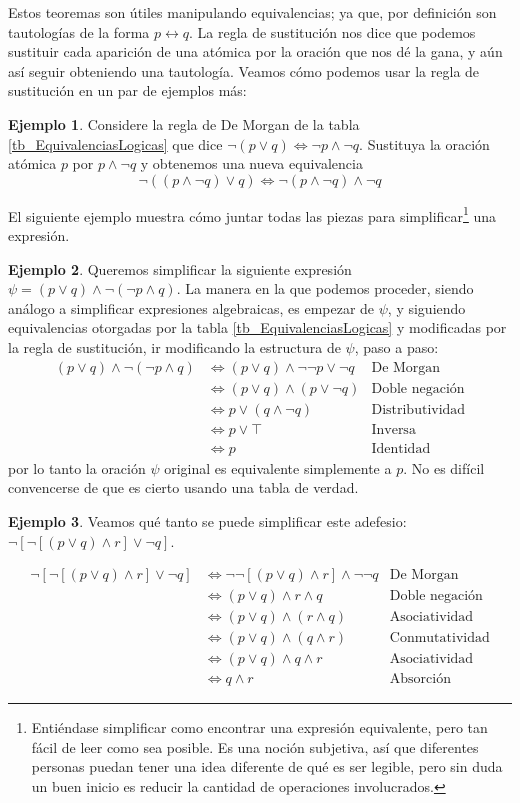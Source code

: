 \documentclass{book}
\theoremstyle{definition}
\newtheorem{ejm}{Ejemplo}[chapter]
\begin{document}
Estos teoremas son útiles manipulando equivalencias; ya que, por definición son tautologías de la forma $p\leftrightarrow q$.
La regla de sustitución nos dice que podemos sustituir cada aparición de una atómica por la oración que nos dé la gana, y aún así seguir obteniendo una tautología.
Veamos cómo podemos usar la regla de sustitución en un par de ejemplos más:
\begin{ejm}
	Considere la regla de De Morgan de la tabla \ref{tb_EquivalenciasLogicas} que dice $\neg(p \vee q) \iff \neg p \wedge \neg q$. Sustituya la oración atómica $p$ por $p\wedge \neg q$ y obtenemos una nueva equivalencia \[\neg ((p \wedge \neg q) \vee q) \iff \neg (p \wedge \neg q) \wedge \neg q\]
\end{ejm}
El siguiente ejemplo muestra cómo juntar todas las piezas para simplificar\footnote{Entiéndase simplificar como encontrar una expresión equivalente, pero tan fácil de leer como sea posible. Es una noción subjetiva, así que diferentes personas puedan tener una idea diferente de qué es ser legible, pero sin duda un buen inicio es reducir la cantidad de operaciones involucrados.} una expresión.
\begin{ejm}
	Queremos simplificar la siguiente expresión $\psi = (p\vee q)\wedge \neg(\neg p \wedge q)$. La manera en la que podemos proceder, siendo análogo a simplificar expresiones algebraicas, es empezar de $\psi$, y siguiendo equivalencias otorgadas por la tabla \ref{tb_EquivalenciasLogicas} y modificadas por la regla de sustitución, ir modificando la estructura de $\psi$, paso a paso:
	\begin{align*}
		(p\vee q)\wedge \neg(\neg p \wedge q) & \iff (p \vee q)\wedge \neg \neg p \vee \neg q & \text{De Morgan}
		\\ & \iff (p \vee q)\wedge (p\vee \neg q) & \text{Doble negación}
		\\ & \iff p \vee (q \wedge \neg q) & \text{Distributividad}
		\\ & \iff p \vee \top & \text{Inversa}
		\\ & \iff p & \text{Identidad}
	\end{align*}
	por lo tanto la oración $\psi$ original es equivalente simplemente a $p$. No es difícil convencerse de que es cierto usando una tabla de verdad.
\end{ejm}
\begin{ejm}
	Veamos qué tanto se puede simplificar este adefesio: $\neg \left[\neg \left[ (p\vee q)\wedge r\right]\vee \neg q \right]$.
	
	\begin{align*}
		\neg \left[\neg \left[ (p\vee q)\wedge r\right]\vee \neg q \right] & \iff \neg \neg \left[ (p\vee q)\wedge r\right] \wedge \neg \neg q & \text{De Morgan} \\
		& \iff  (p\vee q)\wedge r \wedge q & \text{Doble negación}\\
		& \iff (p \vee q)\wedge (r \wedge q) & \text{Asociatividad}\\
		& \iff (p\vee q)\wedge (q \wedge r) & \text{Conmutatividad}\\
		& \iff (p\vee q)\wedge q \wedge r & \text{Asociatividad}\\
		& \iff q \wedge r & \text{Absorción}
	\end{align*}
\end{ejm}
\end{document}
